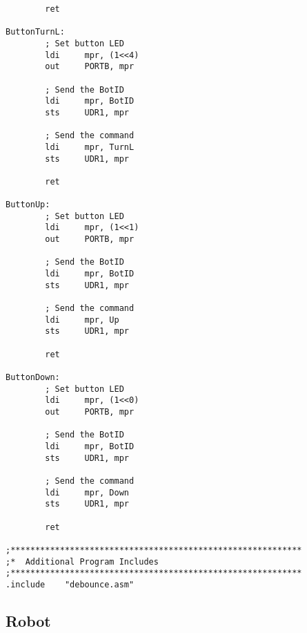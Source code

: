 \documentclass[12pt,letterpaper]{article}
\begin{document}
\begin{verbatim}
        ret

ButtonTurnL:
        ; Set button LED
        ldi     mpr, (1<<4)
        out     PORTB, mpr

        ; Send the BotID
        ldi     mpr, BotID
        sts     UDR1, mpr

        ; Send the command
        ldi     mpr, TurnL
        sts     UDR1, mpr

        ret

ButtonUp:
        ; Set button LED
        ldi     mpr, (1<<1)
        out     PORTB, mpr

        ; Send the BotID
        ldi     mpr, BotID
        sts     UDR1, mpr

        ; Send the command
        ldi     mpr, Up
        sts     UDR1, mpr

        ret
        
ButtonDown:
        ; Set button LED
        ldi     mpr, (1<<0)
        out     PORTB, mpr

        ; Send the BotID
        ldi     mpr, BotID
        sts     UDR1, mpr

        ; Send the command
        ldi     mpr, Down
        sts     UDR1, mpr

        ret

;***********************************************************
;*  Additional Program Includes
;***********************************************************
.include    "debounce.asm"
\end{verbatim}

\subsection{Robot}
\end{document}
